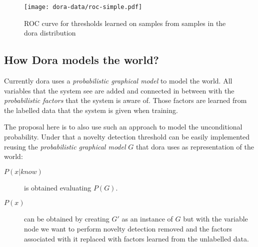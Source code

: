 \documentclass[a4paper]{article}
\begin{document}



\begin{figure}[h]
\centering
\texttt{[image: dora-data/roc-simple.pdf]}
\caption{ROC curve for thresholds learned on samples from samples in the dora distribution}
\label{fig:dora-data-simple}
\end{figure}






\clearpage
\subsection{How Dora models the world?}
\label{sec:dora-models}

Currently dora uses a \emph{probabilistic graphical model} to model the world.
All variables that the system see are added and connected in between with the
\emph{probabilistic factors} that the system is aware of.
Those factors are learned from the labelled data that the system is given when
training.

The proposal here is to also use such an approach to model the unconditional
probability.
Under that a novelty detection threshold can be easily implemented
reusing the \emph{probabilistic graphical model} $G$ that dora uses as
representation of the world:
\begin{description}
\item[$P(x|know)$] is obtained evaluating $P(G)$.
\item[$P(x)$] can be obtained by creating $G'$ as an instance of $G$ but with the
variable node we want to perform novelty detection removed and the factors associated
with it replaced with factors learned from the unlabelled data.
\end{description}
\end{document}
